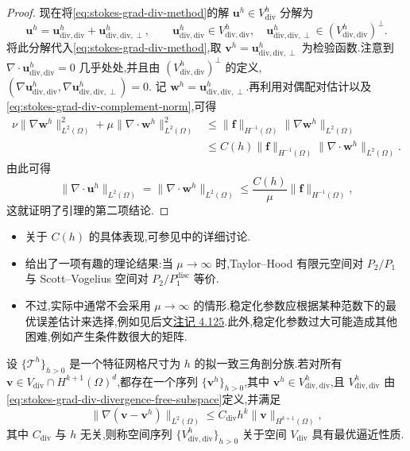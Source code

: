 \begin{proof}
现在将\cref{eq:stokes-grad-div-method}的解 $\bm{u}^h\in V_{\mathrm{div}}^h$ 分解为
\[
 \bm{u}^h=\bm{u}_{\mathrm{div,div}}^h
              +\bm{u}_{\mathrm{div,div},\perp}^h,
 \qquad
 \bm{u}_{\mathrm{div,div}}^h\in V_{\mathrm{div,div}}^h,
 \quad
 \bm{u}_{\mathrm{div,div},\perp}^h\in(V_{\mathrm{div,div}}^h)^\perp.
\]
将此分解代入\cref{eq:stokes-grad-div-method},取
$\bm{v}^h=\bm{u}_{\mathrm{div,div},\perp}^h$ 为检验函数.注意到
$\nabla\cdot\bm{u}_{\mathrm{div,div}}^h=0$ 几乎处处,并且由
$(V_{\mathrm{div,div}}^h)^\perp$ 的定义,
$(\nabla\bm{u}_{\mathrm{div,div}}^h,
  \nabla\bm{u}_{\mathrm{div,div},\perp}^h)=0$.
记 $\bm{w}^h=\bm{u}_{\mathrm{div,div},\perp}^h$.再利用对偶配对估计以及\cref{eq:stokes-grad-div-complement-norm},可得
\begin{align*}
 \nu\|\nabla\bm{w}^h\|_{L^2(\Omega)}^2
  +\mu\|\nabla\cdot\bm{w}^h\|_{L^2(\Omega)}^2
 &\le \|\bm{f}\|_{H^{-1}(\Omega)}
       \|\nabla\bm{w}^h\|_{L^2(\Omega)}\\
 &\le C(h)\|\bm{f}\|_{H^{-1}(\Omega)}
       \|\nabla\cdot\bm{w}^h\|_{L^2(\Omega)}.
\end{align*}
由此可得
\[
 \|\nabla\cdot\bm{u}^h\|_{L^2(\Omega)}
 =\|\nabla\cdot\bm{w}^h\|_{L^2(\Omega)}
 \le \frac{C(h)}{\mu}\|\bm{f}\|_{H^{-1}(\Omega)},
\]
这就证明了引理的第二项结论.
\end{proof}



\begin{note}[稳定化参数的选取]\label{note:stokes-grad-div-parameter-choice}
\begin{itemize}
  \item 关于 $C(h)$ 的具体表现,可参见\textcite{GalvinLinkeRebholzWilson2012}中的详细讨论.
  \item \textcite{CaseErvinLinkeRebholz2011}给出了一项有趣的理论结果:当 $\mu\to\infty$ 时,Taylor--Hood 有限元空间对 $P_2/P_1$ 与 Scott--Vogelius 空间对 $P_2/P_1^{\mathrm{disc}}$ 等价.
  \item 不过,实际中通常不会采用 $\mu\to\infty$ 的情形.稳定化参数应根据某种范数下的最优误差估计来选择,例如见后文\hyperref[note:stokes-grad-div-error-estimate-optimality]{注记 4.125}.此外,稳定化参数过大可能造成其他困难,例如产生条件数很大的矩阵.
\end{itemize}
\end{note}

\begin{definition}[散度自由子空间序列的最优逼近性质]\label{def:stokes-optimal-approximation-divergence-free-subspaces}
设 $\{\mathcal{T}^h\}_{h>0}$ 是一个特征网格尺寸为 $h$ 的拟一致三角剖分族.若对所有 $\bm{v}\in V_{\mathrm{div}}\cap H^{k+1}(\Omega)^d$,都存在一个序列 $\{\bm{v}^h\}_{h>0}$,其中 $\bm{v}^h\in V_{\mathrm{div,div}}^h$,且 $V_{\mathrm{div,div}}^h$ 由\cref{eq:stokes-grad-div-divergence-free-subspace}定义,并满足
\begin{equation}\label{eq:stokes-divergence-free-optimal-approximation}
 \|\nabla(\bm{v}-\bm{v}^h)\|_{L^2(\Omega)}
 \le C_{\mathrm{div}}h^k\|\bm{v}\|_{H^{k+1}(\Omega)},
\end{equation}
其中 $C_{\mathrm{div}}$ 与 $h$ 无关,则称空间序列 $\{V_{\mathrm{div,div}}^h\}_{h>0}$ 关于空间 $V_{\mathrm{div}}$ 具有最优逼近性质.
\end{definition}

